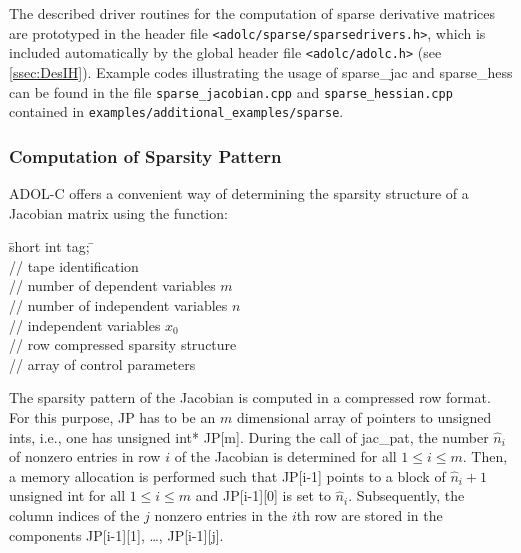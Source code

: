 \documentclass[11pt,twoside]{article}
\begin{document}
The described driver routines for the computation of sparse derivative
matrices are prototyped in the header file
\verb=<adolc/sparse/sparsedrivers.h>=, which is included automatically by the
global header file \verb=<adolc/adolc.h>= (see \autoref{ssec:DesIH}).
Example codes illustrating the usage of {\sf
  sparse\_jac} and {\sf sparse\_hess} can be found in the file 
\verb=sparse_jacobian.cpp=  and \verb=sparse_hessian.cpp= contained in %
\verb=examples/additional_examples/sparse=.
%
\subsubsection*{Computation of Sparsity Pattern}
%
ADOL-C offers a convenient way of determining the  
sparsity structure of a Jacobian matrix using the function:
%
\begin{tabbing}
\hspace{0.5in}\={\sf short int tag;} \hspace{1.3in}\= \kill    %
\\
 \> // tape identification \\
 \> // number of dependent variables $m$\\
 \> // number of independent variables $n$\\
 \> // independent variables $x_0$\\
 \> // row compressed sparsity structure\\
 \> // array of control parameters
\end{tabbing}
%
The sparsity pattern of the
Jacobian is computed in a compressed row format. For this purpose,
{\sf JP} has to be an $m$ dimensional array of pointers to {\sf
  unsigned int}s, i.e., one has {\sf unsigned int* JP[m]}. 
During the call of  {\sf jac\_pat}, the number $\hat{n}_i$ of nonzero
entries in row $i$ of the Jacobian is determined for all $1\le i\le
m$. Then, a memory allocation is performed such that {\sf JP[i-1]}
points to a block of $\hat{n}_i+1$ {\sf  unsigned int} for all $1\le
i\le m$ and {\sf JP[i-1][0]} is set to $\hat{n}_i$. Subsequently, the
column indices of the $j$ nonzero entries in the $i$th row are stored
in the components  {\sf JP[i-1][1]}, \ldots, {\sf JP[i-1][j]}.
\end{document}
